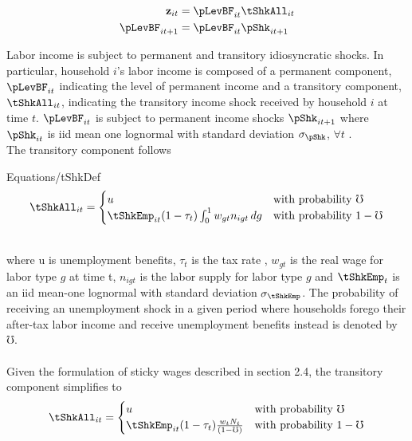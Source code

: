 \documentclass[titlepage]{\econtex}\providecommand{\texname}{BufferStockTheory}
\providecommand{\EqDir}{Equations}
\begin{document}
\begin{align*}
\mathbf{z}_{it} &= \pLevBF_{it}\tShkAll_{it} \\
\pLevBF_{it+1} &=\pLevBF_{it} \pShk_{it+1} \\
\end{align*}


Labor income is subject to permanent and transitory idiosyncratic shocks. In particular, household $i$'s labor income is composed of a permanent component, $\pLevBF_{it} $ indicating the level of permanent income and a transitory component, $\tShkAll_{it} $, indicating the transitory income shock received by household $i$ at time $t$. $\pLevBF_{it} $ is subject to permanent income shocks $\pShk_{it+1}$ where $\pShk_{it}$ is iid mean one lognormal with standard deviation $\sigma_\pShk$, $\forall t$ . \\



The transitory component follows   \\
\begin{verbatimwrite}{\EqDir/tShkDef}
$$
\tShkAll _{it}=
\begin{cases}
 u \phantom{_{t+1}/\pNotZero} & \text{with probability $\mho $} \\
 \tShkEmp_{it} (1-\tau_{t})\int_{0}^{1} w_{gt}n_{igt} \, dg      & \text{with probability $1 - \mho  $} 
\end{cases} \label{eq:tShkDef}
$$
\end{verbatimwrite}
\\
where u is unemployment benefits, $\tau_{t}$ is the tax rate , $w_{gt}$ is the real wage for labor type $g$ at time t, $ n_{igt}$ is the labor supply for labor type $g$ and $\tShkEmp_{t}$ is an iid mean-one lognormal with standard deviation $\sigma_{\tShkEmp}$.  The probability of receiving an unemployment shock in a given period where households forego their after-tax labor income and receive unemployment benefits instead is denoted by $\mho$.  \\ \\

Given the formulation of sticky wages described in section 2.4, the transitory component simplifies to \\

\begin{equation}
\tShkAll _{it}=
\begin{cases}
 u \phantom{_{t+1}/\pNotZero} & \text{with probability $\mho $} \\
 \tShkEmp_{it} (1-\tau_{t})\frac{w_{t}N_{t}}{(1-\mho)}      & \text{with probability $1 - \mho  $} 
\end{cases} \label{eq:tShkDef}
\end{equation} 
\end{document}

